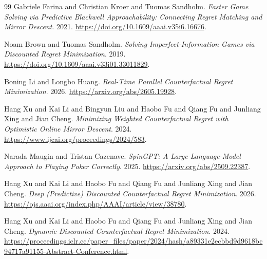 \begin{thebibliography}{99}
 Gabriele Farina and Christian Kroer and Tuomas Sandholm. \emph{Faster Game Solving via Predictive Blackwell Approachability: Connecting Regret Matching and Mirror Descent}. 2021. \url{https://doi.org/10.1609/aaai.v35i6.16676}.

 Noam Brown and Tuomas Sandholm. \emph{Solving Imperfect-Information Games via Discounted Regret Minimization}. 2019. \url{https://doi.org/10.1609/aaai.v33i01.33011829}.

 Boning Li and Longbo Huang. \emph{Real-Time Parallel Counterfactual Regret Minimization}. 2026. \url{https://arxiv.org/abs/2605.19928}.

 Hang Xu and Kai Li and Bingyun Liu and Haobo Fu and Qiang Fu and Junliang Xing and Jian Cheng. \emph{Minimizing Weighted Counterfactual Regret with Optimistic Online Mirror Descent}. 2024. \url{https://www.ijcai.org/proceedings/2024/583}.

 Narada Maugin and Tristan Cazenave. \emph{SpinGPT: A Large-Language-Model Approach to Playing Poker Correctly}. 2025. \url{https://arxiv.org/abs/2509.22387}.

 Hang Xu and Kai Li and Haobo Fu and Qiang Fu and Junliang Xing and Jian Cheng. \emph{Deep (Predictive) Discounted Counterfactual Regret Minimization}. 2026. \url{https://ojs.aaai.org/index.php/AAAI/article/view/38780}.

 Hang Xu and Kai Li and Haobo Fu and Qiang Fu and Junliang Xing and Jian Cheng. \emph{Dynamic Discounted Counterfactual Regret Minimization}. 2024. \url{https://proceedings.iclr.cc/paper_files/paper/2024/hash/a89331e2ecbbd9d9618bc94717a91155-Abstract-Conference.html}.

\end{thebibliography}
